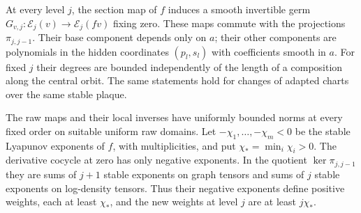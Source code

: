 \begin{lemma}\label{nf:raw-dynamics}
At every level $j$, the section map of $f$ induces a smooth
invertible germ
$G_{v,j}:\mathcal E_j(v)\to\mathcal E_j(fv)$ fixing zero.  These maps
commute with the projections $\pi_{j,j-1}$.  Their base component
depends only on $a$; their other components are polynomials in the
hidden coordinates $(p_l,s_l)$ with coefficients smooth in $a$.
For fixed $j$ their degrees are bounded independently of the length
of a composition along the central orbit.  The same statements hold
for changes of adapted charts over the same stable plaque.

The raw maps and their local inverses have uniformly bounded norms
at every fixed order on suitable uniform raw domains.  Let
$-\chi_1,\ldots,-\chi_m<0$ be the stable Lyapunov exponents of $f$,
with multiplicities, and put $\chi_*=\min_i\chi_i>0$.  The derivative
cocycle at zero has only negative exponents.  In the quotient
$\ker\pi_{j,j-1}$ they are sums of $j+1$ stable exponents on graph
tensors and sums of $j$ stable exponents on log-density tensors.
Thus their negative exponents define positive weights, each at
least $\chi_*$, and the new weights at level $j$ are at least
$j\chi_*$.
\end{lemma}

